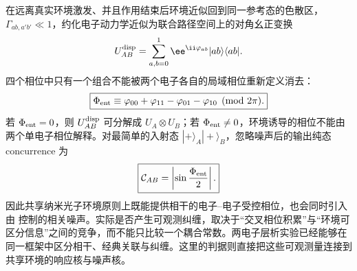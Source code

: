 在远离真实环境激发、并且作用结束后环境近似回到同一参考态的色散区，$\Gamma_{ab,a'b'}\ll1$，约化电子动力学近似为联合路径空间上的对角幺正变换
\[
U_{AB}^{\rm disp}
=\sum_{a,b=0}^{1}
\ee^{\ii\varphi_{ab}}|ab\rangle\langle ab|.
\]
四个相位中只有一个组合不能被两个电子各自的局域相位重新定义消去：
\begin{equation}
\boxed{
\Phi_{\rm ent}
\equiv
\varphi_{00}+\varphi_{11}-\varphi_{01}-\varphi_{10}
\pmod{2\pi}.}
\label{eq:two_electron_entangling_phase_invariant}
\end{equation}
若 $\Phi_{\rm ent}=0$，则 $U_{AB}^{\rm disp}$ 可分解成 $U_A\otimes U_B$；若
$\Phi_{\rm ent}\neq0$，环境诱导的相位不能由两个单电子相位解释。对最简单的入射态
$|+\rangle_A|+\rangle_B$，忽略噪声后的输出纯态 concurrence 为
\begin{equation}
\boxed{
\mathcal C_{AB}
=\left|\sin\frac{\Phi_{\rm ent}}2\right|.}
\label{eq:two_electron_controlled_phase_concurrence}
\end{equation}
因此共享纳米光子环境原则上既能提供相干的电子--电子受控相位，也会同时引入由 控制的相关噪声。实际是否产生可观测纠缠，取决于“交叉相位积累”与“环境可区分信息”之间的竞争，而不能只比较一个耦合常数。两电子层析实验已经能够在同一框架中区分相干、经典关联与纠缠\cite{Tziperman2026TwoElectron}。这里的判据则直接把这些可观测量连接到共享环境的响应核与噪声核。

